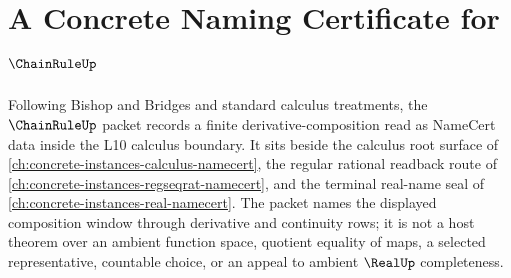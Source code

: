 \chapter{A Concrete Naming Certificate for $\ChainRuleUp$}
\label{ch:concrete-instances-chain-rule-namecert}

Following Bishop and Bridges and standard calculus treatments, the $\ChainRuleUp$ packet records a finite derivative-composition read as NameCert data inside the L10 calculus boundary. It sits beside the calculus root surface of \autoref{ch:concrete-instances-calculus-namecert}, the regular rational readback route of \autoref{ch:concrete-instances-regseqrat-namecert}, and the terminal real-name seal of \autoref{ch:concrete-instances-real-namecert}. The packet names the displayed composition window through derivative and continuity rows; it is not a host theorem over an ambient function space, quotient equality of maps, a selected representative, countable choice, or an appeal to ambient $\RealUp$ completeness.

